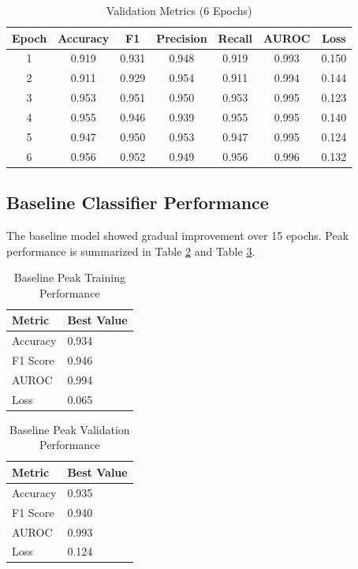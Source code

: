 \documentclass[conference]{IEEEtran}
\begin{document}
\begin{table}[htbp]
\caption{Validation Metrics (6 Epochs)}
\centering
\begin{tabular}{@{}ccccccc@{}}
\toprule
\textbf{Epoch} & \textbf{Accuracy} & \textbf{F1} & \textbf{Precision} & \textbf{Recall} & \textbf{AUROC} & \textbf{Loss} \\ \midrule
1 & 0.919 & 0.931 & 0.948 & 0.919 & 0.993 & 0.150 \\
2 & 0.911 & 0.929 & 0.954 & 0.911 & 0.994 & 0.144 \\
3 & 0.953 & 0.951 & 0.950 & 0.953 & 0.995 & 0.123 \\
4 & 0.955 & 0.946 & 0.939 & 0.955 & 0.995 & 0.140 \\
5 & 0.947 & 0.950 & 0.953 & 0.947 & 0.995 & 0.124 \\
6 & 0.956 & 0.952 & 0.949 & 0.956 & 0.996 & 0.132 \\ \bottomrule
\end{tabular}
\label{tab:val_metrics}
\end{table}

\subsection{Baseline Classifier Performance}
The baseline model showed gradual improvement over 15 epochs. Peak performance is summarized in Table \ref{tab:baseline_train} and Table \ref{tab:baseline_val}.

\begin{table}[htbp]
\caption{Baseline Peak Training Performance}
\centering
\begin{tabular}{@{}ll@{}}
\toprule
\textbf{Metric} & \textbf{Best Value} \\ \midrule
Accuracy & 0.934 \\
F1 Score & 0.946 \\
AUROC & 0.994 \\
Loss & 0.065 \\ \bottomrule
\end{tabular}
\label{tab:baseline_train}
\end{table}

\begin{table}[htbp]
\caption{Baseline Peak Validation Performance}
\centering
\begin{tabular}{@{}ll@{}}
\toprule
\textbf{Metric} & \textbf{Best Value} \\ \midrule
Accuracy & 0.935 \\
F1 Score & 0.940 \\
AUROC & 0.993 \\
Loss & 0.124 \\ \bottomrule
\end{tabular}
\label{tab:baseline_val}
\end{table}
\end{document}
